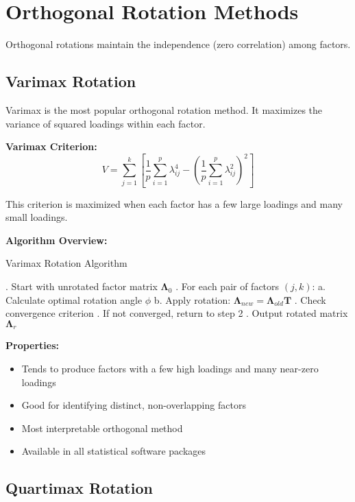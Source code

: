 \documentclass[a4paper]{tufte-book}
\begin{document}
\section{Orthogonal Rotation Methods}

Orthogonal rotations maintain the independence (zero correlation) among factors.

\subsection{Varimax Rotation}

Varimax is the most popular orthogonal rotation method. It maximizes the variance of squared loadings within each factor.

\begin{mathconcept}
\textbf{Varimax Criterion:}
$$V = \sum_{j=1}^{k} \left[ \frac{1}{p}\sum_{i=1}^{p} \lambda_{ij}^4 - \left(\frac{1}{p}\sum_{i=1}^{p} \lambda_{ij}^2\right)^2 \right]$$

This criterion is maximized when each factor has a few large loadings and many small loadings.
\end{mathconcept}

\textbf{Algorithm Overview:}
\begin{algorithm}
\caption{Varimax Rotation Algorithm}
\begin{algorithmic}
. Start with unrotated factor matrix $\boldsymbol{\Lambda}_0$
. For each pair of factors $(j,k)$:
\STATE \quad a. Calculate optimal rotation angle $\phi$
\STATE \quad b. Apply rotation: $\boldsymbol{\Lambda}_{new} = \boldsymbol{\Lambda}_{old} \mathbf{T}$
. Check convergence criterion
. If not converged, return to step 2
. Output rotated matrix $\boldsymbol{\Lambda}_r$
\end{algorithmic}
\end{algorithm}

\textbf{Properties:}
\begin{itemize}
\item Tends to produce factors with a few high loadings and many near-zero loadings
\item Good for identifying distinct, non-overlapping factors
\item Most interpretable orthogonal method
\item Available in all statistical software packages
\end{itemize}

\subsection{Quartimax Rotation}
\end{document}
